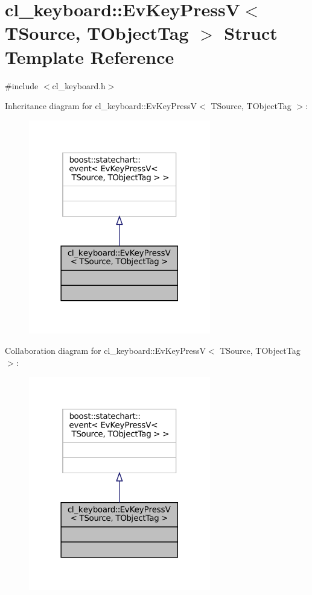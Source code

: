 \hypertarget{structcl__keyboard_1_1EvKeyPressV}{}\section{cl\+\_\+keyboard\+:\+:Ev\+Key\+PressV$<$ T\+Source, T\+Object\+Tag $>$ Struct Template Reference}
\label{structcl__keyboard_1_1EvKeyPressV}


{\ttfamily \#include $<$cl\+\_\+keyboard.\+h$>$}



Inheritance diagram for cl\+\_\+keyboard\+:\+:Ev\+Key\+PressV$<$ T\+Source, T\+Object\+Tag $>$\+:
\nopagebreak
\begin{figure}[H]
\begin{center}
\leavevmode
\includegraphics[width=225pt]{structcl__keyboard_1_1EvKeyPressV__inherit__graph}
\end{center}
\end{figure}


Collaboration diagram for cl\+\_\+keyboard\+:\+:Ev\+Key\+PressV$<$ T\+Source, T\+Object\+Tag $>$\+:
\nopagebreak
\begin{figure}[H]
\begin{center}
\leavevmode
\includegraphics[width=225pt]{structcl__keyboard_1_1EvKeyPressV__coll__graph}
\end{center}
\end{figure}


